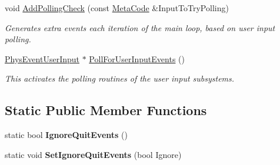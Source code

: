 \begin{DoxyCompactItemize}
\item 
void \hyperlink{classPhysEventManager_a1e99385441c5377a741561db581ef3ae}{AddPollingCheck} (const \hyperlink{classMetaCode}{MetaCode} \&InputToTryPolling)
\begin{DoxyCompactList}\small\item\em Generates extra events each iteration of the main loop, based on user input polling. \item\end{DoxyCompactList}\item 
\hyperlink{classPhysEventUserInput}{PhysEventUserInput} $\ast$ \hyperlink{classPhysEventManager_ac66ebe495e2a77d06803291711528db2}{PollForUserInputEvents} ()
\begin{DoxyCompactList}\small\item\em This activates the polling routines of the user input subsystems. \item\end{DoxyCompactList}\end{DoxyCompactItemize}
\subsection*{Static Public Member Functions}
\begin{DoxyCompactItemize}
\item 
\hypertarget{classPhysEventManager_a9783a16342acd71c9a11ade41a2e226b}{
static bool {\bfseries IgnoreQuitEvents} ()}
\label{d5/dd7/classPhysEventManager_a9783a16342acd71c9a11ade41a2e226b}

\item 
\hypertarget{classPhysEventManager_acc902586015a3cd903d14cb20cd51386}{
static void {\bfseries SetIgnoreQuitEvents} (bool Ignore)}
\label{d5/dd7/classPhysEventManager_acc902586015a3cd903d14cb20cd51386}

\end{DoxyCompactItemize}


